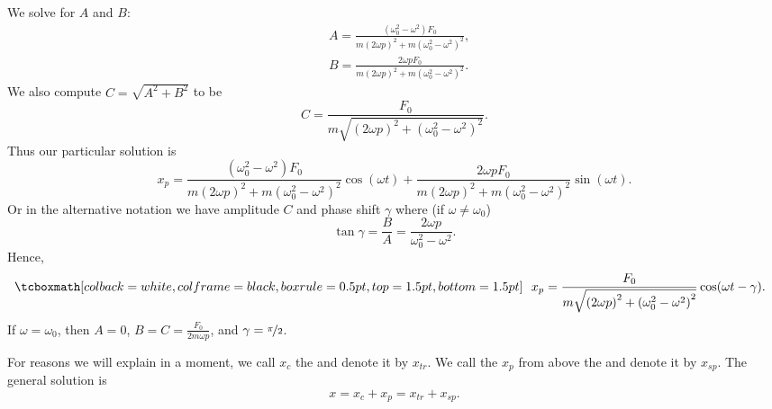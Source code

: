 We solve for $A$ and $B$:
\begin{equation*}
\begin{aligned}
& A=\frac{(\omega_0^2-\omega^2) F_0}
{m{(2\omega p)}^2+m{(\omega_0^2-\omega^2)}^2} , \\
& B=\frac{2 \omega p F_0}
{m{(2\omega p)}^2+m{(\omega_0^2-\omega^2)}^2} .
\end{aligned}
\end{equation*}
We also compute $C = \sqrt{A^2+B^2}$
to be
\begin{equation*}
C = \frac{F_0}{m \sqrt{{(2\omega p)}^2+{(\omega_0^2-\omega^2)}^2}} .
\end{equation*}
Thus our particular solution is
\begin{equation*}
x_p = 
\frac{(\omega_0^2-\omega^2) F_0}
{m{(2\omega p)}^2+m{(\omega_0^2-\omega^2)}^2} \cos (\omega t) +
\frac{2 \omega p F_0}
{m{(2\omega p)}^2+m{(\omega_0^2-\omega^2)}^2} \sin (\omega t) .
\end{equation*}
Or in the alternative notation we have amplitude $C$ and phase shift $\gamma$
where (if $\omega \not= \omega_0$)
\begin{equation*}
\tan \gamma = \frac{B}{A} = \frac{2\omega p}{\omega_0^2-\omega^2} .
\end{equation*}
Hence,
\begin{equation*}
\mybxbg{~~
x_p = 
\frac{F_0}{m \sqrt{{(2\omega p)}^2+{(\omega_0^2-\omega^2)}^2}} 
\cos ( \omega t - \gamma ) .
~~}
\end{equation*}
If $\omega = \omega_0$, then $A=0$, $B = C = \frac{F_0}{2m\omega p}$,
and $\gamma = \nicefrac{\pi}{2}$.



\medskip

For reasons we will explain in a moment, we call $x_c$ the
\emph{}
and denote it by $x_{tr}$.  We call the
$x_p$ from above the \emph{} and denote it
by $x_{sp}$.
The general solution is
\begin{equation*}
x = x_c + x_p = x_{tr} + x_{sp} .
\end{equation*}

